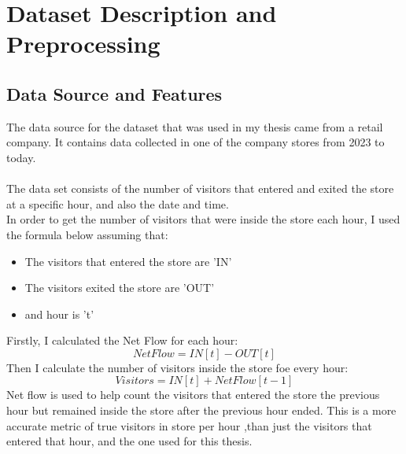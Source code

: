 \documentclass{article}
\begin{document}
\section{Dataset Description and Preprocessing}
\subsection{Data Source and Features}
The data source for the dataset that was used in my thesis came from a retail company. It contains data collected in one of the company stores from 2023 to today.\\
\\
The data set consists of the number of visitors that entered and exited the store at a specific hour, and also the date and time.\\
In order to get the number of visitors that were inside the store each hour, I used the formula below assuming that:
\begin{itemize}
    \item  The visitors that entered the store are 'IN'
\end{itemize}
\begin{itemize}
    \item The visitors exited the store are 'OUT'
\end{itemize}
\begin{itemize}
    \item and hour is 't'
\end{itemize}

Firstly, I calculated the Net Flow for each hour:
\begin{equation}
NetFlow = IN[t] - OUT[t]
\end{equation}
Then I calculate the number of visitors inside the store foe every hour:
\begin{equation}
Visitors = IN[t] + NetFlow[t-1]
\end{equation}
Net flow is used to help count the visitors that entered the store the previous hour but remained inside the store after the previous hour ended. This is a more accurate metric of true visitors in store per hour ,than just the visitors that entered that hour, and the one used for this thesis.
\end{document}
